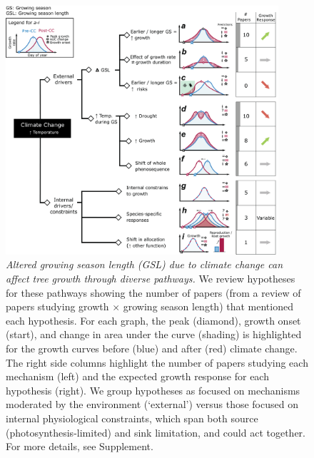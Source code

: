 \documentclass[11pt]{article}
\begin{document}
\begin{figure}[h!]
\includegraphics[width=0.9\textwidth]{..//figures/_figuresFromRuben/conceptualRev.png}
\caption{\emph{Altered growing season length (GSL) due to climate change can affect tree growth through diverse pathways.} We review hypotheses for these pathways showing the number of papers (from a review of papers studying growth $\times$ growing season length) that mentioned each hypothesis. For each graph, the peak (diamond), growth onset (start), and change in area under the curve (shading) is highlighted for the growth curves before (blue) and after (red) climate change. The right side columns highlight the number of papers studying each mechanism (left) and the expected growth response for each hypothesis (right). We group hypotheses as focused on mechanisms moderated by the environment (`external') versus those focused on internal physiological constraints, which span both source (photosynthesis-limited) and sink limitation, and could act together. For more details, see Supplement.} 
\label{fig:hypotheses}
\end{figure}
\end{document}

